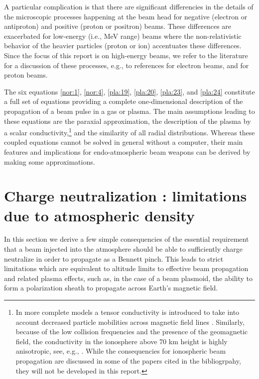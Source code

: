 \documentclass [12pt,a4paper,     ]{report} %
\begin{document}
    A particular complication is that there are significant differencies in the details of the microscopic processes happening at the beam head for negative (electron or antiproton) and positive (proton or positron) beams.  These differences are exacerbated for low-energy (i.e., MeV range) beams where the non-relativistic behavior of the heavier particles (proton or ion) accentuates these differences.  Since the focus of this report is on high-energy beams, we refer to the literature for a discussion of these processes, e.g., to references \cite{OLSON1973-, IYYEN1989-} for electron beams, and \cite{OLIVE1996-, OTTIN2000-} for proton beams.

	The six equations \eqref{nor:1}, \eqref{nor:4}, \eqref{pla:19}, \eqref{pla:20}, \eqref{pla:23}, and \eqref{pla:24} constitute a full set of equations providing a complete one-dimensional description of the propagation of a beam pulse in a gas or plasma.  The main assumptions leading to these equations are the paraxial approximation, the description of the plasma by a scalar conductivity,\footnote{In more complete models a tensor conductivity is introduced to take into account decreased particle mobilities across magnetic field lines \cite{STRAS2003-}.  Similarly, because of the low collision frequencies and the presence of the geomagnetic field, the conductivity in the ionosphere above 70 km height is highly anisotropic, see, e.g., \cite{SUGIU1972-}.  While the consequencies for ionospheric beam propagation are discussed in some of the papers cited in the bibliogrpahy, they will not be developed in this report. } and the similarity of all radial distributions.  Whereas these coupled equations cannot be solved in general without a computer, their main features and implications for endo-atmospheric beam weapons can be derived by making some approximations.



\section{Charge neutralization : limitations due to atmospheric density}
\label{cnc:0}

In this section we derive a few simple consequencies of the essential requirement that a beam injected into the atmosphere should be able to sufficiently charge neutralize in order to propagate as a Bennett pinch.  This leads to strict limitations which are equivalent to altitude limits to effective beam propagation and related plasma effects, such as, in the case of a beam plasmoid, the ability to form a polarization sheath to propagate across Earth's magnetic field.
\end{document}
